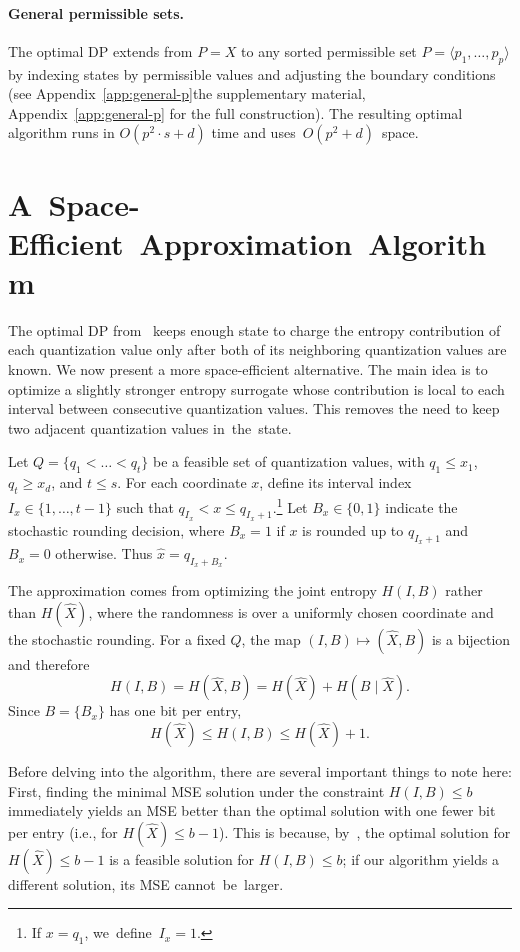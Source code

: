 \documentclass[11pt,letterpaper]{article}
\newcommand{\appendixlocation}[1]{\ifarxiv Appendix~\ref{#1}\else the supplementary material, Appendix~\ref{#1}\fi}
\begin{document}
{\paragraph{General permissible sets.}
The optimal DP extends from $P=X$ to any sorted permissible set
$P=\langle p_1,\ldots,p_p\rangle$ by indexing states by permissible values and
adjusting the boundary conditions (see \appendixlocation{app:general-p} for the full construction). The resulting optimal algorithm runs in
$O(p^2\cdot s+d)$ time and \mbox{uses $O(p^2+d)$ space.}

\section{\mbox{A Space-Efficient Approximation Algorithm}}\label{sec:apxDP}
The optimal DP from~ keeps enough state to charge the entropy contribution of each quantization value only after both of its neighboring quantization values are known. We now present a more space-efficient alternative. The main idea is to optimize a slightly stronger entropy surrogate whose contribution is local to each interval between consecutive quantization values. This removes the need to keep two adjacent quantization values \mbox{in the state.}

Let $Q=\{q_1<\ldots<q_t\}$ be a feasible set of quantization values, with $q_1\le x_1$, $q_t\ge x_d$, and $t\le s$. For each coordinate $x$, define its interval index $I_x\in\{1,\ldots,t-1\}$ such that
$q_{I_x}<x\le q_{I_x+1}$.\footnote{If $x=q_1$, \mbox{we define $I_{x}=1$.}}
Let $B_x\in\{0,1\}$ indicate the stochastic rounding decision, where $B_x=1$ if $x$ is rounded up to $q_{I_x+1}$ and $B_x=0$ otherwise. Thus $\widehat x=q_{I_x+B_x}$.

The approximation comes from optimizing the joint entropy $H(I,B)$ rather than $H(\widehat X)$, where the randomness is over a uniformly chosen coordinate and the stochastic rounding. For a fixed $Q$, the map $(I,B)\mapsto (\widehat X,B)$ is a bijection and therefore
\[
H(I,B)=H(\widehat X,B)=H(\widehat X)+H(B\mid \widehat X).
\]
Since $B=\{B_x\}$ has one bit per entry,
\begin{equation}
    H(\widehat X)\le H(I,B)\le H(\widehat X)+1 .
    \label{eq:apx_entropy_sandwich}
\end{equation}

Before delving into the algorithm, there are several important things to note here: First, finding the minimal MSE solution under the constraint $H(I,B)\le b$ immediately yields an MSE better than the optimal solution with one fewer bit per entry (i.e., for $H(\widehat X)\le b-1$).
This is because, by~, the optimal solution for $H(\widehat X)\le b-1$ is a feasible solution for $H(I,B)\le b$; if our algorithm yields a different solution, its MSE \mbox{cannot be larger.}

}
\end{document}
